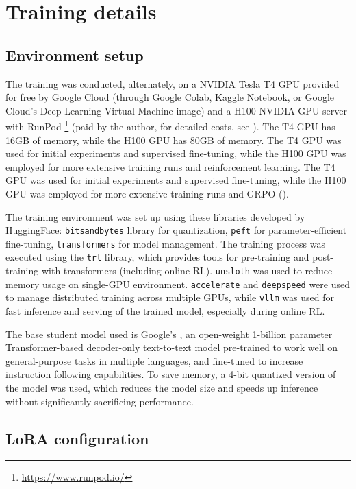 \section{Training details} \label{app:training-details}
\subsection{Environment setup}
The training was conducted, alternately, on a NVIDIA Tesla T4 GPU provided for free by Google Cloud (through Google Colab, Kaggle Notebook, or Google Cloud's Deep Learning Virtual Machine image) and a H100 NVIDIA GPU server with RunPod \footnote{\url{https://www.runpod.io/}} (paid by the author, for detailed costs, see ). The T4 GPU has 16GB of memory, while the H100 GPU has 80GB of memory. The T4 GPU was used for initial experiments and supervised fine-tuning, while the H100 GPU was employed for  more extensive training runs and reinforcement learning. The T4 GPU was used for initial experiments and supervised fine-tuning, while the H100 GPU was employed for more extensive training runs and GRPO ().

The training environment was set up using these libraries developed by HuggingFace: \verb|bitsandbytes| library for quantization, \verb|peft| for parameter-efficient fine-tuning, \verb|transformers| for model management. The training process was executed using the \verb|trl| library, which provides tools for pre-training and post-training with transformers (including online RL). \verb|unsloth| was used to reduce memory usage on single-GPU environment. \verb|accelerate| and \verb|deepspeed| were used to manage distributed training across multiple GPUs, while \verb|vllm| was used for fast inference and serving of the trained model, especially during online RL.

The base student model used is Google's \studentmodel, an open-weight 1-billion parameter Transformer-based decoder-only text-to-text model pre-trained to work well on general-purpose tasks in multiple languages, and fine-tuned to increase instruction following capabilities. To save memory, a 4-bit quantized version of the model was used, which reduces the model size and speeds up inference without significantly sacrificing performance.

\subsection{LoRA configuration} \label{app:lora-config}

